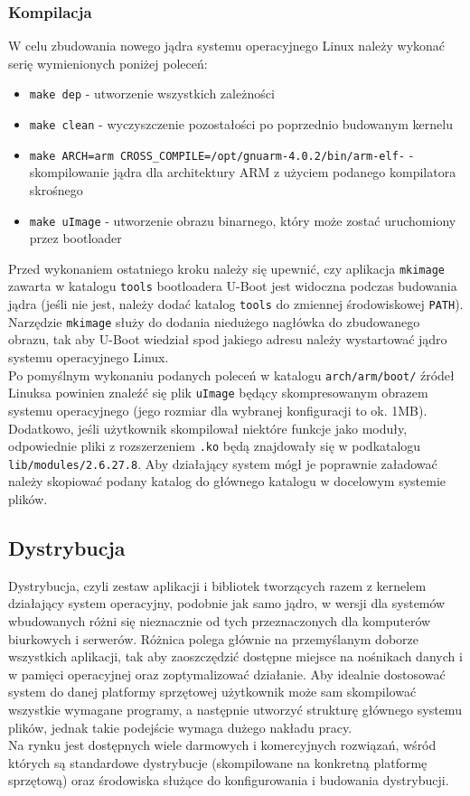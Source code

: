 \documentclass[a4paper,12pt]{book}
\begin{document}
				\subsubsection{Kompilacja}
					W celu zbudowania nowego jądra systemu operacyjnego Linux należy wykonać serię wymienionych poniżej poleceń:
					\begin{itemize}
						\item \texttt{make dep} - utworzenie wszystkich zależności
						\item \texttt{make clean} - wyczyszczenie pozostałości po poprzednio budowanym kernelu
						\item \texttt{make ARCH=arm CROSS\_COMPILE=/opt/gnuarm-4.0.2/bin/arm-elf-} - skompilowanie jądra dla architektury ARM z użyciem podanego kompilatora skrośnego
						\item \texttt{make uImage} - utworzenie obrazu binarnego, który może zostać uruchomiony przez bootloader
					\end{itemize}
					Przed wykonaniem ostatniego kroku należy się upewnić, czy aplikacja \texttt{mkimage} zawarta w katalogu \texttt{tools} bootloadera U-Boot jest widoczna podczas budowania jądra (jeśli nie jest, należy dodać katalog \texttt{tools} do zmiennej środowiskowej \texttt{PATH}). Narzędzie \texttt{mkimage} służy do dodania niedużego nagłówka do zbudowanego obrazu, tak aby U-Boot wiedział spod jakiego adresu należy wystartować jądro systemu operacyjnego Linux.\\
					Po pomyślnym wykonaniu podanych poleceń w katalogu \texttt{arch/arm/boot/} źródeł Linuksa powinien znaleźć się plik \texttt{uImage} będący skompresowanym obrazem systemu operacyjnego (jego rozmiar dla wybranej konfiguracji to ok. 1MB). Dodatkowo, jeśli użytkownik skompilował niektóre funkcje jako moduły, odpowiednie pliki z rozszerzeniem \texttt{.ko} będą znajdowały się w podkatalogu \texttt{lib/modules/2.6.27.8}. Aby działający system mógł je poprawnie załadować należy skopiować podany katalog do głównego katalogu w docelowym systemie plików.
			\subsection{Dystrybucja}
				Dystrybucja, czyli zestaw aplikacji i bibliotek tworzących razem z kernelem działający system operacyjny, podobnie jak samo jądro, w wersji dla systemów wbudowanych różni się nieznacznie od tych przeznaczonych dla komputerów biurkowych i serwerów. Różnica polega głównie na przemyślanym doborze wszystkich aplikacji, tak aby zaoszczędzić dostępne miejsce na nośnikach danych i w pamięci operacyjnej oraz zoptymalizować działanie. Aby idealnie dostosować system do danej platformy sprzętowej użytkownik może sam skompilować wszystkie wymagane programy, a następnie utworzyć strukturę głównego systemu plików, jednak takie podejście wymaga dużego nakładu pracy.\\
				Na rynku jest dostępnych wiele darmowych i komercyjnych rozwiązań, wśród których są standardowe dystrybucje (skompilowane na konkretną platformę sprzętową) oraz środowiska służące do konfigurowania i budowania dystrybucji.
\end{document}
